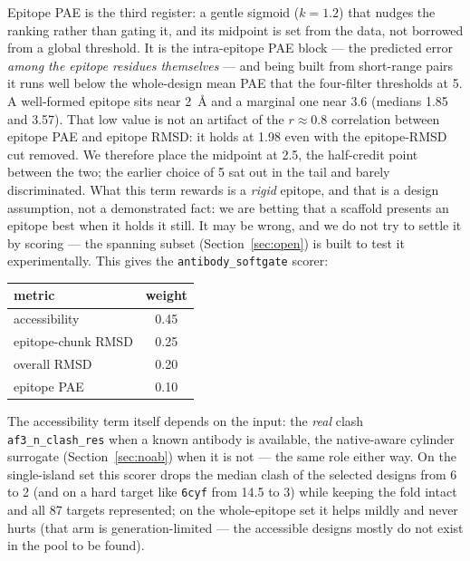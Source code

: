 Epitope PAE is the third register: a gentle sigmoid ($k=1.2$) that nudges the ranking rather than gating
it, and its midpoint is set from the data, not borrowed from a global threshold. It is the intra-epitope
PAE block --- the predicted error \emph{among the epitope residues themselves} --- and being built from
short-range pairs it runs well below the whole-design mean PAE that the four-filter thresholds at 5. A
well-formed epitope sits near \SI{2}{\angstrom} and a marginal one near \num{3.6} (medians \num{1.85} and
\num{3.57}). That low value is not an artifact of the $r\!\approx\!0.8$ correlation between epitope PAE
and epitope RMSD: it holds at \num{1.98} even with the epitope-RMSD cut removed. We therefore place the
midpoint at \num{2.5}, the half-credit point between the two; the earlier choice of 5 sat out in the tail
and barely discriminated. What this term rewards is a \emph{rigid} epitope, and that is a design assumption, not a
demonstrated fact: we are betting that a scaffold presents an epitope best when it holds it still. It may
be wrong, and we do not try to settle it by scoring --- the spanning subset (Section~\ref{sec:open}) is
built to test it experimentally. This gives the \texttt{antibody\_softgate} scorer:

\begin{center}
\begin{tabular}{lc}
\toprule
metric & weight \\
\midrule
accessibility      & 0.45 \\
epitope-chunk RMSD & 0.25 \\
overall RMSD       & 0.20 \\
epitope PAE        & 0.10 \\
\bottomrule
\end{tabular}
\end{center}

\noindent
The accessibility term itself depends on the input: the \emph{real} clash \texttt{af3\_n\_clash\_res}
when a known antibody is available, the native-aware cylinder surrogate (Section~\ref{sec:noab}) when it
is not --- the same role either way. On the single-island set this scorer drops the median clash of the
selected designs from 6 to 2 (and on a hard target like \texttt{6cyf} from \num{14.5} to 3) while keeping
the fold intact and all \num{87} targets represented; on the whole-epitope set it helps mildly and never
hurts (that arm is generation-limited --- the accessible designs mostly do not exist in the pool to be
found).

